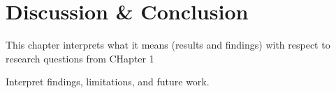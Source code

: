 \chapter{Discussion \& Conclusion} \label{sec:conclusion}

This chapter  interprets what it means (results and findings) with respect to research questions from CHapter 1


Interpret findings, limitations, and future work.